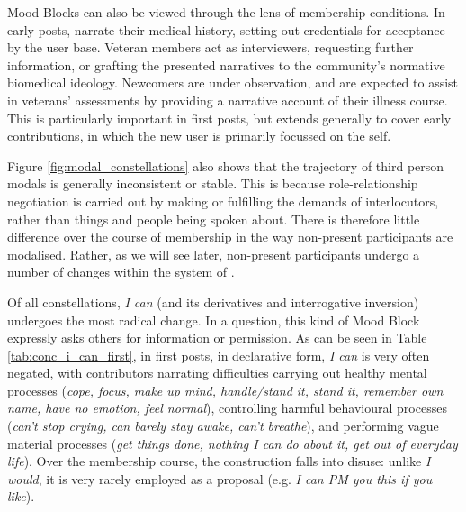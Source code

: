 Mood Blocks can also be viewed through the lens of  membership conditions. In early \glspl{post},  narrate their medical history, setting out credentials for acceptance by the user base. Veteran \glspl{member} act as interviewers, requesting further information, or grafting the presented narratives to the community's normative biomedical ideology. Newcomers are under observation, and are expected to assist in veterans' assessments by providing a narrative account of their illness course. This is particularly important in first \glspl{post}, but extends generally to cover early contributions, in which the new user is primarily focussed on the self.

Figure \ref{fig:modal_constellations} also shows that the trajectory of third person modals is generally inconsistent or stable. This is because role\hyp{}relationship negotiation is carried out by making or fulfilling the demands of interlocutors, rather than things and people being spoken about. There is therefore little difference over the course of membership in the way non\hyp{}present participants are modalised. Rather, as we will see later, non\hyp{}present participants undergo a number of changes within the system of .

Of all constellations, \emph{I can} (and its derivatives and interrogative inversion) undergoes the most radical change. In a question, this kind of Mood Block expressly asks others for information or permission. As can be seen in Table \ref{tab:conc_i_can_first}, in first \glspl{post}, in declarative form, \emph{I can} is very often negated, with contributors narrating difficulties carrying out healthy mental processes (\emph{cope, focus, make up mind, handle\slash stand it, stand it, remember own name, have no emotion, feel normal}), controlling harmful behavioural processes (\emph{can't stop crying, can barely stay awake, can't breathe}), and performing vague material processes (\emph{get things done, nothing I can do about it, get out of everyday life}). Over the membership course, the construction falls into disuse: unlike \emph{I would}, it is very rarely employed as a proposal (e.g. \emph{I can PM you this if you like}).


